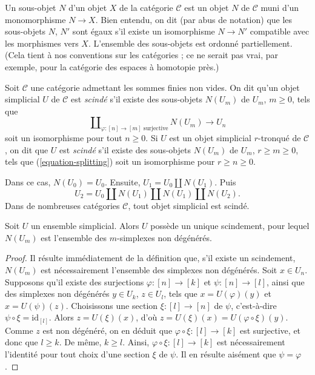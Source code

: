 \noindent
Un sous-objet $N$ d'un objet $X$ de la catégorie $\mathcal{C}$ est un
objet $N$ de $\mathcal{C}$ muni d'un monomorphisme $N \to X$.
Bien entendu, on dit (par abus de notation) que les sous-objets
$N$, $N'$ sont égaux s'il existe un isomorphisme $N \to N'$ compatible
avec les morphismes vers $X$. L'ensemble des sous-objets est ordonné
partiellement. (Cela tient à nos conventions sur les catégories ; ce ne
serait pas vrai, par exemple, pour la catégorie des espaces à homotopie près.)

\begin{definition}
\label{definition-split}
Soit $\mathcal{C}$ une catégorie admettant les sommes finies non vides.
On dit qu'un objet simplicial $U$ de $\mathcal{C}$ est {\it scindé}
s'il existe des sous-objets $N(U_m)$ de $U_m$, $m \geq 0$, tels que
\begin{equation}
\label{equation-splitting}
\coprod\nolimits_{\varphi : [n] \to [m]\text{ surjective}}
N(U_m)
\longrightarrow
U_n
\end{equation}
soit un isomorphisme pour tout $n \geq 0$. Si $U$ est un objet
simplicial $r$-tronqué de $\mathcal{C}$, on dit que $U$ est {\it scindé}
s'il existe des sous-objets $N(U_m)$ de $U_m$, $r \geq m \geq 0$,
tels que (\ref{equation-splitting}) soit un isomorphisme pour
$r \geq n \geq 0$.
\end{definition}

\noindent
Dans ce cas, $N(U_0) = U_0$. Ensuite,
$U_1 = U_0 \amalg N(U_1)$. Puis
$$
U_2 = U_0 \amalg N(U_1) \amalg N(U_1) \amalg N(U_2).
$$
Dans de nombreuses catégories $\mathcal{C}$, tout objet simplicial est scindé.

\begin{lemma}
\label{lemma-splitting-simplicial-sets}
Soit $U$ un ensemble simplicial. Alors $U$ possède un unique scindement,
pour lequel $N(U_m)$ est l'ensemble des $m$-simplexes non dégénérés.
\end{lemma}

\begin{proof}
Il résulte immédiatement de la définition que, s'il existe un scindement,
$N(U_m)$ est nécessairement l'ensemble des simplexes non dégénérés.
Soit $x \in U_n$. Supposons qu'il existe des surjections
$\varphi : [n] \to [k]$ et $\psi : [n] \to [l]$, ainsi que des simplexes
non dégénérés $y \in U_k$, $z \in U_l$, tels que
$x = U(\varphi)(y)$ et $x = U(\psi)(z)$. Choisissons une section
$\xi : [l] \to [n]$ de $\psi$, c'est-à-dire
$\psi \circ \xi = \text{id}_{[l]}$. Alors $z = U(\xi)(x)$, d'où
$z = U(\xi)(x) = U(\varphi \circ \xi)(y)$. Comme $z$ est non dégénéré,
on en déduit que $\varphi \circ \xi : [l] \to [k]$ est surjective, et
donc que $l \geq k$. De même, $k \geq l$. Ainsi,
$\varphi \circ \xi : [l] \to [k]$ est nécessairement l'identité pour
tout choix d'une section $\xi$ de $\psi$. Il en résulte aisément que
$\psi = \varphi$.
\end{proof}

